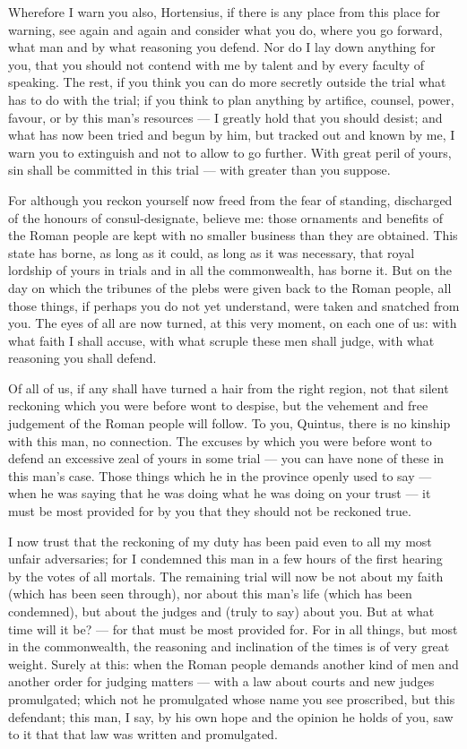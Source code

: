 Wherefore I warn you also, Hortensius, if there is any place from this place for warning, see again and again and consider what you do, where you go forward, what man and by what reasoning you defend. Nor do I lay down anything for you, that you should not contend with me by talent and by every faculty of speaking. The rest, if you think you can do more secretly outside the trial what has to do with the trial; if you think to plan anything by artifice, counsel, power, favour, or by this man's resources --- I greatly hold that you should desist; and what has now been tried and begun by him, but tracked out and known by me, I warn you to extinguish and not to allow to go further. With great peril of yours, sin shall be committed in this trial --- with greater than you suppose.

 For although you reckon yourself now freed from the fear of standing, discharged of the honours of consul-designate, believe me: those ornaments and benefits of the Roman people are kept with no smaller business than they are obtained. This state has borne, as long as it could, as long as it was necessary, that royal lordship of yours in trials and in all the commonwealth, has borne it. But on the day on which the tribunes of the plebs were given back to the Roman people, all those things, if perhaps you do not yet understand, were taken and snatched from you. The eyes of all are now turned, at this very moment, on each one of us: with what faith I shall accuse, with what scruple these men shall judge, with what reasoning you shall defend.

 Of all of us, if any shall have turned a hair from the right region, not that silent reckoning which you were before wont to despise, but the vehement and free judgement of the Roman people will follow. To you, Quintus, there is no kinship with this man, no connection. The excuses by which you were before wont to defend an excessive zeal of yours in some trial --- you can have none of these in this man's case. Those things which he in the province openly used to say --- when he was saying that he was doing what he was doing on your trust --- it must be most provided for by you that they should not be reckoned true.

 I now trust that the reckoning of my duty has been paid even to all my most unfair adversaries; for I condemned this man in a few hours of the first hearing by the votes of all mortals. The remaining trial will now be not about my faith (which has been seen through), nor about this man's life (which has been condemned), but about the judges and (truly to say) about you. But at what time will it be? --- for that must be most provided for. For in all things, but most in the commonwealth, the reasoning and inclination of the times is of very great weight. Surely at this: when the Roman people demands another kind of men and another order for judging matters --- with a law about courts and new judges promulgated; which not he promulgated whose name you see proscribed, but this defendant; this man, I say, by his own hope and the opinion he holds of you, saw to it that that law was written and promulgated.

